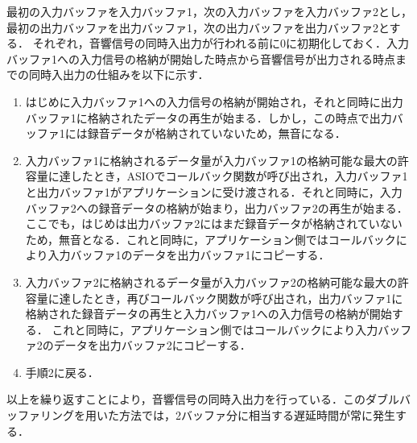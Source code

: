 最初の入力バッファを入力バッファ1，次の入力バッファを入力バッファ2とし，最初の出力バッファを出力バッファ1，次の出力バッファを出力バッファ2とする．
それぞれ，音響信号の同時入出力が行われる前に0に初期化しておく．入力バッファ1への入力信号の格納が開始した時点から音響信号が出力される時点までの同時入出力の仕組みを以下に示す．
\begin{enumerate}[leftmargin=*]
\item はじめに入力バッファ1への入力信号の格納が開始され，それと同時に出力バッファ1に格納されたデータの再生が始まる．しかし，この時点で出力バッファ1には録音データが格納されていないため，無音になる．
\item 入力バッファ1に格納されるデータ量が入力バッファ1の格納可能な最大の許容量に達したとき，ASIOでコールバック関数が呼び出され，入力バッファ1と出力バッファ1がアプリケーションに受け渡される．それと同時に，入力バッファ2への録音データの格納が始まり，出力バッファ2の再生が始まる．ここでも，はじめは出力バッファ2にはまだ録音データが格納されていないため，無音となる．これと同時に，アプリケーション側ではコールバックにより入力バッファ1のデータを出力バッファ1にコピーする．
\item 入力バッファ2に格納されるデータ量が入力バッファ2の格納可能な最大の許容量に達したとき，再びコールバック関数が呼び出され，出力バッファ1に格納された録音データの再生と入力バッファ1への入力信号の格納が開始する．
これと同時に，アプリケーション側ではコールバックにより入力バッファ2のデータを出力バッファ2にコピーする．
\item 手順2に戻る．
\end{enumerate}
以上を繰り返すことにより，音響信号の同時入出力を行っている．このダブルバッファリングを用いた方法では，2バッファ分に相当する遅延時間が常に発生する．
